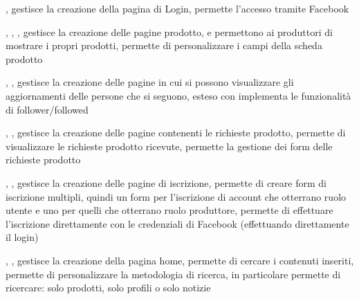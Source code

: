 {, }
{ gestisce la creazione della pagina di Login,  permette l'accesso tramite Facebook}


{, , , }
{ gestisce la creazione delle pagine prodotto,  e  permettono ai produttori di mostrare i propri prodotti,  permette di personalizzare i campi della scheda prodotto}


{, , }
{ gestisce la creazione delle pagine in cui si possono visualizzare gli aggiornamenti delle persone che si seguono,  esteso con  implementa le funzionalità di follower/followed}


{, , }
{ gestisce la creazione delle pagine contenenti le richieste prodotto,  permette di visualizzare le richieste prodotto ricevute,  permette la gestione dei form delle richieste prodotto}


{, , }
{ gestisce la creazione delle pagine di iscrizione,  permette di creare form di iscrizione multipli, quindi un form per l'iscrizione di account che otterrano ruolo utente e uno per quelli che otterrano ruolo produttore,  permette di effettuare l'iscrizione direttamente con le credenziali di Facebook (effettuando direttamente il login)}


{, , }
{ gestisce la creazione della pagina home,  permette di cercare i contenuti inseriti,  permette di personalizzare la metodologia di ricerca, in particolare permette di ricercare: solo prodotti, solo profili o solo notizie}

